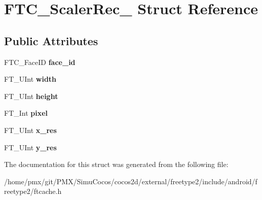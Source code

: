 \hypertarget{structFTC__ScalerRec__}{}\section{F\+T\+C\+\_\+\+Scaler\+Rec\+\_\+ Struct Reference}
\label{structFTC__ScalerRec__}
\subsection*{Public Attributes}
\begin{DoxyCompactItemize}
\item 
\mbox{\label{structFTC__ScalerRec___a8e963aa619409e646558fe7aa272e81f}} 
F\+T\+C\+\_\+\+Face\+ID {\bfseries face\+\_\+id}
\item 
\mbox{\label{structFTC__ScalerRec___a11e13d907ca4661bf7c1d98fffecf321}} 
F\+T\+\_\+\+U\+Int {\bfseries width}
\item 
\mbox{\label{structFTC__ScalerRec___a9b3a9b4d7148bbaa4daaae1e1fbb2dbc}} 
F\+T\+\_\+\+U\+Int {\bfseries height}
\item 
\mbox{\label{structFTC__ScalerRec___ab78868341e2d66f17e6f1d77e9e054d2}} 
F\+T\+\_\+\+Int {\bfseries pixel}
\item 
\mbox{\label{structFTC__ScalerRec___a886c7c1230dc5d5e6b3fc32d06274752}} 
F\+T\+\_\+\+U\+Int {\bfseries x\+\_\+res}
\item 
\mbox{\label{structFTC__ScalerRec___accb53c7a9aeebb41c05f48d14d3dfe71}} 
F\+T\+\_\+\+U\+Int {\bfseries y\+\_\+res}
\end{DoxyCompactItemize}


The documentation for this struct was generated from the following file\+:\begin{DoxyCompactItemize}
\item 
/home/pmx/git/\+P\+M\+X/\+Simu\+Cocos/cocos2d/external/freetype2/include/android/freetype2/ftcache.\+h\end{DoxyCompactItemize}
